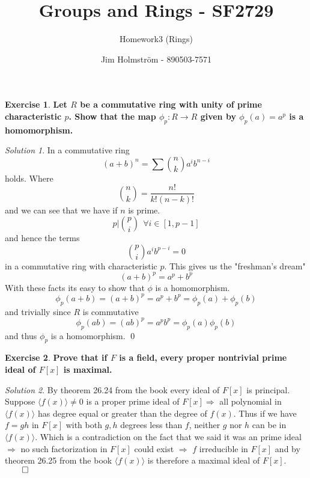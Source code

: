 \documentclass[a4paper,twoside=false,abstract=false,numbers=noenddot,
titlepage=false,headings=small,parskip=half,version=last]{scrartcl}
\author{Jim Holmström - 890503-7571}
\title{Groups and Rings - SF2729}
\subtitle{Homework3 (Rings)}
\theoremstyle{definition}
\newtheorem{exercise}{Exercise}
\theoremstyle{remark}
\newtheorem*{solution}{Solution}
\begin{document}
\maketitle
\thispagestyle{empty}

\begin{exercise}
{\bf
Let $R$ be a commutative ring with unity of prime characteristic $p$. Show that
the map $\phi_p:R\rightarrow R$ given by $\phi_p(a)=a^p$ is a homomorphism.
}
\end{exercise}
\begin{solution}
In a commutative ring 
\begin{equation}
    (a+b)^n=\sum \binom{n}{k} a^ib^{n-i}
\end{equation}
holds. Where
\begin{equation}
    \binom{n}{k} = \frac{n!}{k!(n-k)!}
\end{equation}
and we can see that we have if $n$ is prime.
\begin{equation}
    p|\binom{p}{i} ~~ \forall i \in \left[1,p-1\right]
\end{equation}
and hence the terms
\begin{equation}
    \binom{p}{i}a^ib^{p-i}=0
\end{equation}
in a commutative ring with characteristic $p$. This gives us the "freshman's dream"
\begin{equation}
    (a+b)^p=a^p+b^p
\end{equation}
With these facts its easy to show that $\phi$ is a homomorphism.
\begin{equation}
    \phi_p(a+b)=(a+b)^p=a^p+b^p=\phi_p(a)+\phi_p(b)
\end{equation}
and trivially since $R$ is commutative
\begin{equation}
    \phi_p(ab)=(ab)^p=a^pb^p=\phi_p(a)\phi_p(b)
\end{equation}
and thus $\phi_p$ is a homomorphism. \qed

\end{solution}

\begin{exercise}
{\bf
Prove that if $F$ is a field, every proper nontrivial prime ideal of
$F\left[x\right]$ is maximal.
}
\end{exercise}
\begin{solution}
By theorem 26.24 from the book every ideal of $F\left[x\right]$ is principal.
Suppose $\langle f(x) \rangle \neq {0}$ is a proper prime ideal of
$F\left[x\right] \Rightarrow$ all polynomial in $\langle f(x) \rangle$ has
degree equal or greater than the degree of $f(x)$. Thus if we have $f=gh$
in $F\left[x\right]$ with both $g,h$ degrees less than $f$, neither $g$ nor $h$
can be in $\langle f(x) \rangle$. Which is a contradiction on the fact that we
said it was an prime ideal $\Rightarrow$ no such factorization in
$F\left[x\right]$ could exist $\Rightarrow$ $f$ irreducible in
$F\left[x\right]$ and by theorem 26.25 from the book $\langle f(x) \rangle$ is
therefore a maximal ideal of $F\left[x\right]$. $\qed$

\end{solution}

\end{document}
